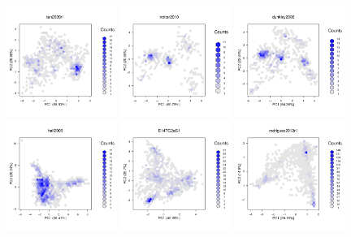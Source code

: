\documentclass[12pt]{article}\usepackage[]{graphicx}\usepackage[]{color}
\begin{document}
\begin{appendices}
\begin{figure}[htb]
  \includegraphics[width = 0.32\textwidth]{./figure/fighexpca-15.pdf}
  \includegraphics[width = 0.32\textwidth]{./figure/fighexpca-16.pdf}
  \includegraphics[width = 0.32\textwidth]{./figure/fighexpca-17.pdf}
  \includegraphics[width = 0.32\textwidth]{./figure/fighexpca-18.pdf}
  \includegraphics[width = 0.32\textwidth]{./figure/fighexpca-19.pdf}
  \includegraphics[width = 0.32\textwidth]{./figure/fighexpca-20.pdf}

\end{figure}
\end{appendices}
\end{document}
